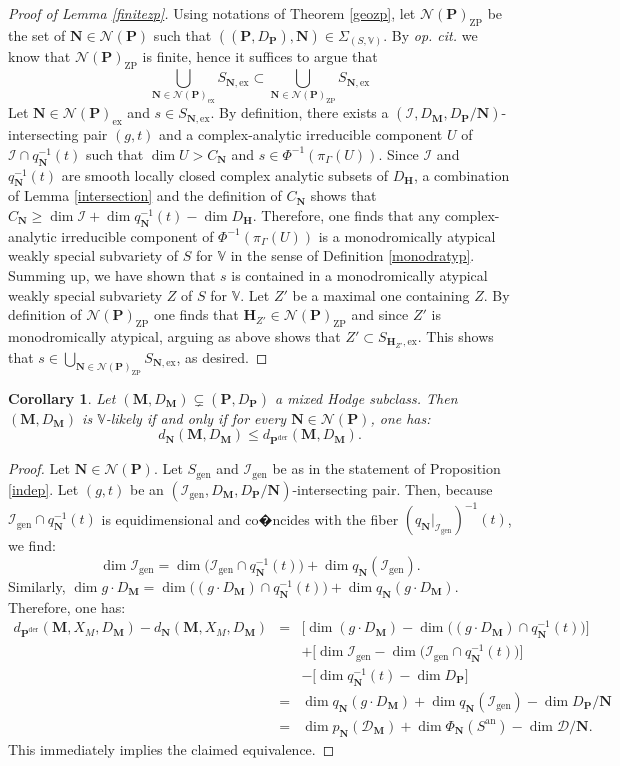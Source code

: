 \documentclass[10pt]{article}
\numberwithin{equation}{subsection}
\theoremstyle{plain}
\newtheorem{corollary}[theorem]{Corollary}
\theoremstyle{definition}
\theoremstyle{remark}
\newcommand{\I}{\mathscr{I}}
\newcommand{\V}{\mathbb V}
\newcommand{\pp}{\mathbf P}
\newcommand{\mon}{\mathbf H}
\newcommand{\M}{\mathbf M}
\newcommand{\NN}{\mathbf N}
\newcommand{\an}{\mathrm{an}}
\newcommand{\period}{\mathscr{D}}
\newcommand{\der}{\mathrm{der}}
\newcommand{\Np}{\mathcal{N}(\pp)}
\newcommand{\ex}{\mathrm{ex}}
\newcommand{\gen}{\mathrm{gen}}
\begin{document}
\begin{proof}[Proof of Lemma \ref{finitezp}]
Using notations of Theorem \ref{geozp}, let $\Np_{\mathrm{ZP}}$ be the set of $\NN \in \Np$ such that $((\pp, D_\pp), \NN) \in \Sigma_{(S, \V)}$. By \textit{op. cit.} we know that $\Np_{\mathrm{ZP}}$ is finite, hence it suffices to argue that
\[
\bigcup_{\NN \in \Np_\ex} S_{\NN, \ex} \subset \bigcup_{\NN \in \Np_{\mathrm{ZP}}} S_{\NN, \ex}
\]
Let $\NN \in \Np_\ex$ and $s \in S_{\NN, \ex}$. By definition, there exists a $(\I, D_\M, D_\pp/\NN)$-intersecting pair $(g,t)$ and a complex-analytic irreducible component $U$ of $\I \cap q_\NN^{-1}(t)$ such that $\dim U > C_\NN$ and $s \in \Phi^{-1}(\pi_\Gamma(U))$. Since $\I$ and $q_\NN^{-1}(t)$ are smooth locally closed complex analytic subsets of $D_\mon$, a combination of Lemma \ref{intersection} and the definition of $C_\NN$ shows that $C_\NN \geqslant \dim \I + \dim q_\NN^{-1}(t) - \dim D_\mon$. Therefore, one finds that any complex-analytic irreducible component of $\Phi^{-1}(\pi_\Gamma(U))$ is a monodromically atypical weakly special subvariety of $S$ for $\V$ in the sense of Definition \ref{monodratyp}. Summing up, we have shown that $s$ is contained in a monodromically atypical weakly special subvariety $Z$ of $S$ for $\V$. Let $Z'$ be a maximal one containing $Z$. By definition of $\Np_\mathrm{ZP}$ one finds that $\mon_{Z'} \in \Np_\mathrm{ZP}$ and since $Z'$ is monodromically atypical, arguing as above shows that $Z' \subset S_{\mon_{Z'}, \ex}$. This shows that $s \in \bigcup_{\NN \in \Np_{\mathrm{ZP}}} S_{\NN, \ex}$, as desired.
\end{proof}
\begin{corollary}\label{reflik}
Let $(\M,D_\M) \subsetneq (\pp,D_\pp)$ a mixed Hodge subclass. Then $(\M,D_\M)$ is $\V$-likely if and only if for every $\NN \in \Np$, one has:
\[
d_\NN(\M,D_\M) \leqslant d_{\pp^\der}(\M,D_\M).
\]
\end{corollary}
\begin{proof}
Let $\NN \in \Np$. Let $S_{\gen}$ and $\I_{\gen}$ be as in the statement of Proposition \ref{indep}. Let $(g,t)$ be an $(\I_{\gen},D_\M,D_\pp/\NN)$-intersecting pair. Then, because $\I_{\gen} \cap q_\NN^{-1}(t)$ is equidimensional and co�ncides with the fiber $(q_\NN \vert_{\I_{\gen}})^{-1}(t)$, we find:
\[
\dim \I_{\gen} = \dim \Big(\I_{\gen} \cap q_\NN^{-1}(t)\Big) + \dim q_\NN(\I_{\gen}).
\]
Similarly, $\dim g \cdot D_\M = \dim \Big((g \cdot D_\M) \cap q_\NN^{-1}(t)\Big) + \dim q_\NN(g \cdot D_\M)$. Therefore, one has:
{\small\begin{eqnarray*}
d_{\pp^\der}(\M,X_M,D_\M) - d_\NN(\M,X_M,D_\M) & = & \Big[ \dim (g \cdot D_\M) - \dim \Big((g \cdot D_\M) \cap q_\NN^{-1}(t)\Big) \Big] \\ & & +\Big[ \dim \I_{\gen} - \dim \Big(\I_{\gen} \cap q_\NN^{-1}(t)\Big)\Big] \\ & & - \Big[ \dim q_\NN^{-1}(t) - \dim D_\pp\Big] \\
& = & \dim q_\NN(g  \cdot D_\M) + \dim q_\NN(\I_{\gen}) - \dim D_\pp/\NN \\
& = & \dim p_\NN(\period_\M) + \dim \Phi_\NN(S^\an) - \dim \period/\NN.
\end{eqnarray*}}
This immediately implies the claimed equivalence.
\end{proof}
\end{document}
